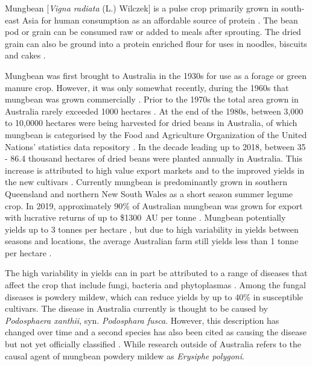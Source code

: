 \documentclass[agronomy,article,submit,moreauthors,pdftex]{mdpi}
\begin{document}

Mungbean {[}\emph{Vigna radiata} (L.) Wilczek{]} is a pulse crop primarily grown in south-east Asia for human consumption as an affordable source of protein \citep{Lambrides2007}.
The bean pod or grain can be consumed raw or added to meals after sprouting.
The dried grain can also be ground into a protein enriched flour for uses in noodles, biscuits and cakes \citep{Chankaew2013}.

Mungbean was first brought to Australia in the 1930s for use as a forage or green manure crop.
However, it was only somewhat recently, during the 1960s that mungbean was grown commercially \citep{Lawn1978, Chauhan2018}.
Prior to the 1970s the total area grown in Australia rarely exceeded 1000 hectares \citep{Lawn1978}.
At the end of the 1980s, between 3,000 to 10,0000 hectares were being harvested for dried beans in Australia, of which mungbean is categorised by the Food and Agriculture Organization of the United Nations' statistics data repository \citep{FAOSTAT}.
In the decade leading up to 2018, between 35 - 86.4 thousand hectares of dried beans were planted annually in Australia.
This increase is attributed to high value export markets and to the improved yields in the new cultivars \citep{Clarry2016}.
Currently mungbean is predominantly grown in southern Queensland and northern New South Wales as a short season summer legume crop.
In 2019, approximately 90\% of Australian mungbean was grown for export with lucrative returns of up to \$1300~AU per tonne \citep{QueenslandGovernment2019}.
Mungbean potentially yields up to 3 tonnes per hectare \citep{ThomasRobert2004}, but due to high variability in yields between seasons and locations, the average Australian farm still yields less than 1 tonne per hectare \citep{Chauhan2018}.

The high variability in yields can in part be attributed to a range of diseases that affect the crop that include fungi, bacteria and phytoplasmas \citep{Wood1990, Conde1991, Thakur1995, Fuhlbohm1996, Fuhlbohm2013, Wilson2001, Noble2019}.
Among the fungal diseases is powdery mildew, which can reduce yields by up to 40\% \citep{Chankaew2013} in susceptible cultivars.
The disease in Australia currently is thought to be caused by \emph{Podosphaera xanthii}, syn. \emph{Podosphara fusca}.
However, this description has changed over time and a second species has also been cited as causing the disease but not yet officially classified \citep{Kelly2019}.
While research outside of Australia refers to the causal agent of mungbean powdery mildew as \emph{Erysiphe polygoni}.
\end{document}
